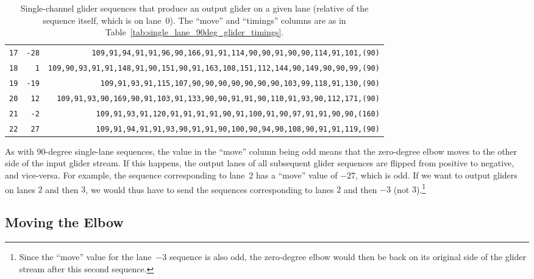 \begin{table}[!phtb]
\begin{tabular}{@{\hskip 0.31cm}L@{\hskip 0.27cm}r@{\hskip 0.27cm}R@{\hskip 0.34cm}}
		\texttt{17} & \texttt{-28} & \scriptsize\texttt{109,91,94,91,91,96,90,166,91,91,114,90,90,91,90,90,114,91,101,{\color{gray}(90)}} \\
		\texttt{18} & \texttt{1} & \scriptsize\texttt{109,90,93,91,91,148,91,90,151,90,91,163,108,151,112,144,90,149,90,90,99,{\color{gray}(90)}} \\
		\texttt{19} & \texttt{-19} & \scriptsize\texttt{109,91,93,91,115,107,90,90,90,90,90,90,90,103,99,118,91,130,{\color{gray}(90)}} \\
		\texttt{20} & \texttt{12} & \scriptsize\texttt{109,91,93,90,169,90,91,103,91,133,90,90,91,91,90,110,91,93,90,112,171,{\color{gray}(90)}} \\
		\texttt{21} & \texttt{-2} & \scriptsize\texttt{109,91,93,91,120,91,91,91,91,90,91,100,91,90,97,91,91,90,90,{\color{gray}(160)}} \\
		\texttt{22} & \texttt{27} & \scriptsize\texttt{109,91,94,91,91,93,90,91,91,90,100,90,94,90,108,90,91,91,119,{\color{gray}(90)}} \\\bottomrule
	\end{tabular}
	\caption{Single-channel glider sequences that produce an output glider on a given lane (relative of the sequence itself, which is on lane~0). The ``move'' and ``timings'' columns are as in Table~\ref{tab:single_lane_90deg_glider_timings}.}\label{tab:single_lane_0deg_glider_timings}
\end{table}
\endgroup

As with 90-degree single-lane sequences, the value in the ``move'' column being odd means that the zero-degree elbow moves to the other side of the input glider stream. If this happens, the output lanes of all subsequent glider sequences are flipped from positive to negative, and vice-versa. For example, the sequence corresponding to lane~2 has a ``move'' value of $-27$, which is odd. If we want to output gliders on lanes $2$ and then $3$, we would thus have to send the sequences corresponding to lanes $2$ and then $-3$ (not $3$).\footnote{Since the ``move'' value for the lane~$-3$ sequence is also odd, the zero-degree elbow would then be back on its original side of the glider stream after this second sequence.}


\subsection{Moving the Elbow}\label{sec:single_channel_zero_move_elbow}

